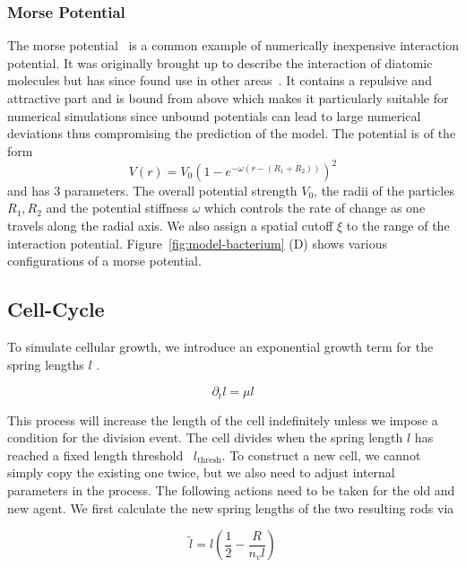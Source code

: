\subsubsection{Morse Potential}
\label{subsec:morse-potential}
The morse potential~\cite{Morse1929} is a common example of numerically inexpensive interaction
potential.
It was originally brought up to describe the interaction of diatomic molecules but
has since found
use in other areas~\cite{Breitwieser2021}.
It contains a repulsive and attractive part and is bound from above which makes it particularly
suitable for numerical simulations since unbound potentials can lead to large
numerical deviations
thus compromising the prediction of the model.
The potential is of the form
\begin{equation}
    V(r) = V_0\left(1-e^{-\omega(r-(R_1+R_2))}\right)^2
\end{equation}
and has 3 parameters.
The overall potential strength $V_0$, the radii of the particles $R_1,R_2$ and the potential
stiffness $\omega$ which controls the rate of change as one travels along the radial axis.
We also assign a spatial cutoff $\xi$ to the range of the interaction potential.
Figure~\ref{fig:model-bacterium} (D) shows various configurations of a morse potential.

\subsection{Cell-Cycle}

To simulate cellular growth, we introduce an exponential growth term for the spring lengths $l$
\cite{Takeuchi2005}.

\begin{equation}
    \partial_t l = \mu l
\end{equation}

This process will increase the length of the cell indefinitely unless we impose a
condition for the
division event.
The cell divides when the spring length $l$ has reached a fixed length
threshold~\cite{Robert2014}
$l_\text{thresh}$.
To construct a new cell, we cannot simply copy the existing one twice, but we also
need to adjust
internal parameters in the process.
The following actions need to be taken for the old and new agent.
We first calculate the new spring lengths of the two resulting rods via

\begin{equation}
    \tilde{l} = l\left(\frac{1}{2} - \frac{R}{n_v l}\right)
\end{equation}

